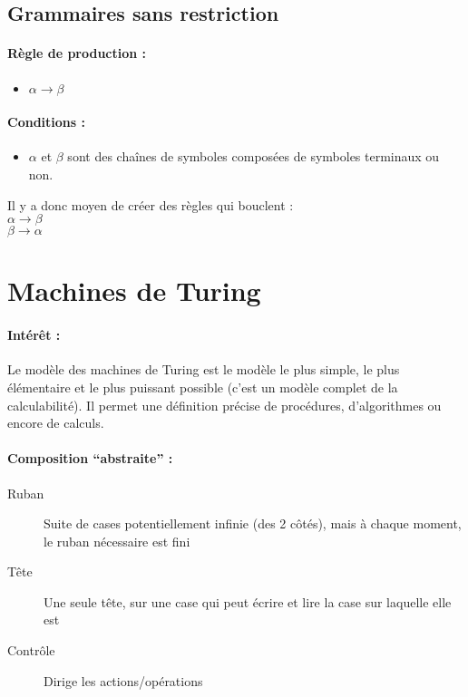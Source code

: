 \subsection{Grammaires sans restriction}

\paragraph{Règle de production :}
\begin{itemize}
	\item $\alpha \rightarrow \beta$
\end{itemize}

\paragraph{Conditions :}

\begin{itemize}
	\item $\alpha$ et $\beta$ sont des chaînes de symboles composées de
		symboles terminaux ou non.
\end{itemize}

\begin{myexem}
	Il y a donc moyen de créer des règles qui bouclent : \\
	$\alpha \rightarrow \beta$ \\
	$\beta \rightarrow \alpha$\\
\end{myexem}

\section{Machines de Turing}
\paragraph{Intérêt :}Le modèle des machines de Turing est le modèle le plus
simple, le plus élémentaire et le plus puissant possible (c'est un modèle
complet de la calculabilité). Il permet une définition précise de procédures,
d'algorithmes ou encore de calculs.

\paragraph{Composition ``abstraite'' :}
\begin{description}
	\item[Ruban] Suite de cases potentiellement infinie (des 2 côtés), mais à
		chaque moment, le ruban nécessaire est fini
	\item[Tête] Une seule tête, sur une case qui peut écrire et lire la
		case sur laquelle elle est
	\item[Contrôle] Dirige les actions/opérations
\end{description}

